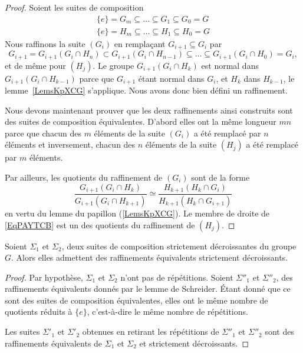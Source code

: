 \begin{proof}
	Soient les suites de composition
	\begin{subequations}
		\begin{align}
			\{ e \}=G_m\subseteq\ldots\subseteq G_1\subseteq G_0=G \\
			\{ e \}=H_m\subseteq\ldots\subseteq H_1\subseteq H_0=G
		\end{align}
	\end{subequations}
	Nous raffinons la suite \( (G_i)\) en remplaçant \( G_{i+1}\subseteq G_i\) par
	\begin{equation}
		G_{i+1}=G_{i+1}(G_i\cap H_n)\subset G_{i+1}(G_i\cap H_{n-1})\subseteq\ldots\subseteq G_{i+1}(G_i\cap H_0)=G_i,
	\end{equation}
	et de même pour \( (H_j)\). Le groupe \( G_{i+1}(G_i\cap H_k)\) est normal dans \( G_{i+1}(G_i\cap H_{k-1})\) parce que \( G_{i+1}\) étant normal dans \( G_i\), et \( H_k\) dans \( H_{k-1}\), le lemme~\ref{LemsKpXCG} s'applique. Nous avons donc bien défini un raffinement.

	Nous devons maintenant prouver que les deux raffinements ainsi construits sont des suites de composition équivalentes. D'abord elles ont la même longueur \( mn\) parce que chacun des \( m\) éléments de la suite \( (G_i)\) a été remplacé par \( n\) éléments et inversement, chacun des \( n\) éléments de la suite \( (H_j)\) a été remplacé par \( m\) éléments.

	Par ailleurs, les quotients du raffinement de \( (G_i)\) sont de la forme
	\begin{equation}    \label{EqPAYTCB}
		\frac{ G_{i+1}(G_i \cap H_k) }{ G_{i+1}(G_i\cap H_{k+1}) }\simeq \frac{ H_{k+1}(H_k\cap G_i) }{ H_{k+1}(H_k\cap G_{i+1}) }
	\end{equation}
	en vertu du lemme du papillon (\ref{LemsKpXCG}). Le membre de droite de \eqref{EqPAYTCB} est un des quotients du raffinement de \( (H_j)\).
\end{proof}

\begin{lemma}    \label{LemBSicRJ}
	Soient \( \Sigma_1\) et \( \Sigma_2\), deux suites de composition strictement décroissantes du groupe \( G\). Alors elles admettent des raffinements équivalents strictement décroissants.
\end{lemma}

\begin{proof}
	Par hypothèse, \( \Sigma_1\) et \( \Sigma_2\) n'ont pas de répétitions. Soient \( \Sigma''_1\) et \( \Sigma''_2\), des raffinements équivalents donnés par le lemme de Schreider. Étant donné que ce sont des suites de composition équivalentes, elles ont le même nombre de quotients réduits à \( \{ e \}\), c'est-à-dire le même nombre de répétitions.

	Les suites \( \Sigma'_1\) et \( \Sigma'_2\) obtenues en retirant les répétitions de \( \Sigma''_1\) et \( \Sigma''_2\) sont des raffinements équivalents de \( \Sigma_1\) et \( \Sigma_2\) et strictement décroissants.
\end{proof}

